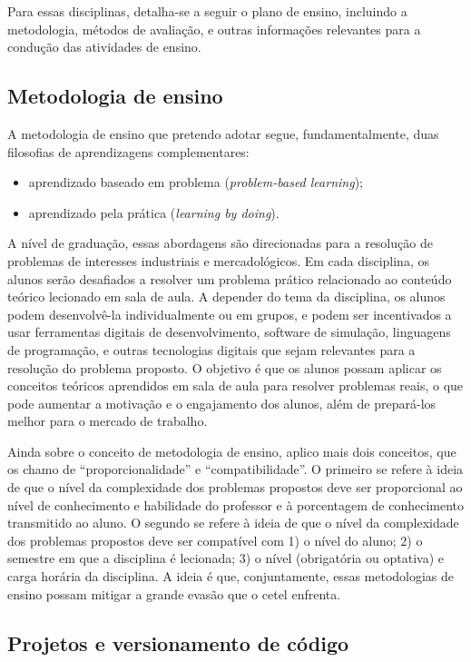 \documentclass{article}
\begin{document}
Para essas disciplinas, detalha-se a seguir o plano de ensino, incluindo a metodologia, métodos de avaliação, e outras informações relevantes para a condução das atividades de ensino.

\subsection{Metodologia de ensino}

A metodologia de ensino que pretendo adotar segue, fundamentalmente, duas filosofias de aprendizagens complementares:
\begin{itemize}
	\item aprendizado baseado em problema (\textit{problem-based learning});
	\item aprendizado pela prática (\textit{learning by doing}).
\end{itemize}

A nível de graduação, essas abordagens são direcionadas para a resolução de problemas de interesses industriais e mercadológicos. Em cada disciplina, os alunos serão desafiados a resolver um problema prático relacionado ao conteúdo teórico lecionado em sala de aula. A depender do tema da disciplina, os alunos podem desenvolvê-la individualmente ou em grupos, e podem ser incentivados a usar ferramentas digitais de desenvolvimento, software de simulação, linguagens de programação, e outras tecnologias digitais que sejam relevantes para a resolução do problema proposto. O objetivo é que os alunos possam aplicar os conceitos teóricos aprendidos em sala de aula para resolver problemas reais, o que pode aumentar a motivação e o engajamento dos alunos, além de prepará-los melhor para o mercado de trabalho.

Ainda sobre o conceito de metodologia de ensino, aplico mais dois conceitos, que os chamo de ``proporcionalidade'' e ``compatibilidade''. O primeiro se refere à ideia de que o nível da complexidade dos problemas propostos deve ser proporcional ao nível de conhecimento e habilidade do professor e à porcentagem de conhecimento transmitido ao aluno. O segundo se refere à ideia de que o nível da complexidade dos problemas propostos deve ser compatível com 1) o nível do aluno; 2) o semestre em que a disciplina é lecionada; 3) o nível (obrigatória ou optativa) e carga horária da disciplina. A ideia é que, conjuntamente, essas metodologias de ensino possam mitigar a grande evasão que o \gls{cetel} enfrenta.


\subsection{Projetos e versionamento de código}
\end{document}
